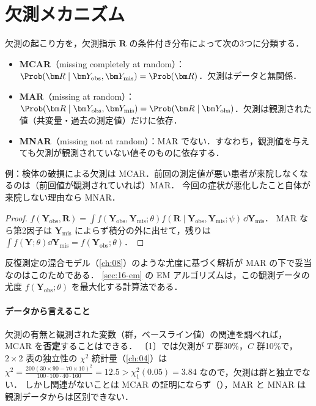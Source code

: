 \section{欠測メカニズム}\label{sec:16-mech}
\Hissu
\begin{teigi}\label{def:16-mech}
欠測の起こり方を，欠測指示 $\bm R$ の条件付き分布によって次の3つに分類する．
\begin{itemize}
\item \textbf{MCAR}（missing completely at random）：$\Prob(\bm R\mid\bm Y_{\mathrm{obs}},\bm Y_{\mathrm{mis}})=\Prob(\bm R)$．欠測はデータと無関係．
\item \textbf{MAR}（missing at random）：$\Prob(\bm R\mid\bm Y_{\mathrm{obs}},\bm Y_{\mathrm{mis}})=\Prob(\bm R\mid\bm Y_{\mathrm{obs}})$．欠測は観測された値（共変量・過去の測定値）だけに依存．
\item \textbf{MNAR}（missing not at random）：MAR でない．すなわち，観測値を与えても欠測が観測されていない値そのものに依存する．
\end{itemize}
\end{teigi}
例：検体の破損による欠測は MCAR．前回の測定値が悪い患者が来院しなくなるのは（前回値が観測されていれば）MAR．
今回の症状が悪化したこと自体が来院しない理由なら MNAR．

\begin{proof}
$f(\bm Y_{\mathrm{obs}},\bm R)=\int f(\bm Y_{\mathrm{obs}},\bm Y_{\mathrm{mis}};\theta)f(\bm R\mid\bm Y_{\mathrm{obs}},\bm Y_{\mathrm{mis}};\psi)\,\dd\bm Y_{\mathrm{mis}}$．
MAR なら第2因子は $\bm Y_{\mathrm{mis}}$ によらず積分の外に出せて，残りは $\int f(\bm Y;\theta)\dd\bm Y_{\mathrm{mis}}=f(\bm Y_{\mathrm{obs}};\theta)$．
\end{proof}
反復測定の混合モデル（\cref{ch:08}）のような尤度に基づく解析が MAR の下で妥当なのはこのためである．
\cref{sec:16-em} の EM アルゴリズムは，この観測データの尤度 $f(\bm Y_{\mathrm{obs}};\theta)$ を最大化する計算法である．

\paragraph{データから言えること}
欠測の有無と観測された変数（群，ベースライン値）の関連を調べれば，MCAR を\textbf{否定}することはできる．
〔1〕では欠測が $T$ 群30\%，$C$ 群10\%で，$2\times2$ 表の独立性の $\chi^2$ 統計量（\cref{ch:04}）は
$\chi^2=\frac{200(30\times90-70\times10)^2}{100\cdot100\cdot40\cdot160}=12.5>\chi^2_1(0.05)=3.84$ なので，欠測は群と独立でない．
しかし関連がないことは MCAR の証明にならず（），MAR と MNAR は観測データからは区別できない．

